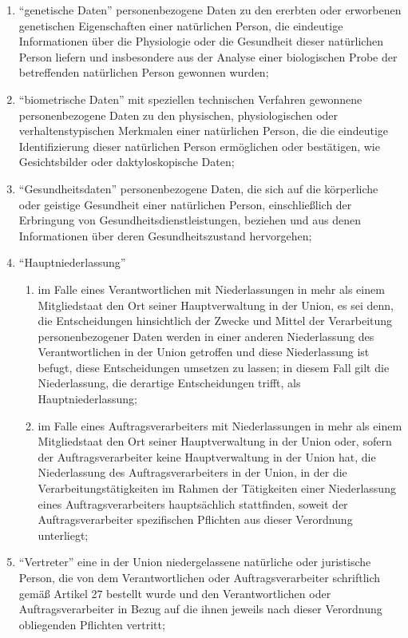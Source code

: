 \begin{enumerate}[label=\arabic*.]
            \item ``genetische Daten'' personenbezogene Daten zu den ererbten oder erworbenen genetischen Eigenschaften einer natürlichen Person, die eindeutige Informationen über die Physiologie oder die Gesundheit dieser natürlichen Person liefern und insbesondere aus der Analyse einer biologischen Probe der betreffenden natürlichen Person gewonnen wurden;
            \item ``biometrische Daten'' mit speziellen technischen Verfahren gewonnene personenbezogene Daten zu den physischen, physiologischen oder verhaltenstypischen Merkmalen einer natürlichen Person, die die eindeutige Identifizierung dieser natürlichen Person ermöglichen oder bestätigen, wie Gesichtsbilder oder daktyloskopische Daten;
            \item ``Gesundheitsdaten'' personenbezogene Daten, die sich auf die körperliche oder geistige Gesundheit einer natürlichen Person, einschließlich der Erbringung von Gesundheitsdienstleistungen, beziehen und aus denen Informationen über deren Gesundheitszustand hervorgehen;
            \item ``Hauptniederlassung''
                \begin{enumerate}[label=\alph*)]
                    \item im Falle eines Verantwortlichen mit Niederlassungen in mehr als einem Mitgliedstaat den Ort seiner Hauptverwaltung in der Union, es sei denn, die Entscheidungen hinsichtlich der Zwecke und Mittel der Verarbeitung personenbezogener Daten werden in einer anderen Niederlassung des Verantwortlichen in der Union getroffen und diese Niederlassung ist befugt, diese Entscheidungen umsetzen zu lassen; in diesem Fall gilt die Niederlassung, die derartige Entscheidungen trifft, als Hauptniederlassung;
                    \item im Falle eines Auftragsverarbeiters mit Niederlassungen in mehr als einem Mitgliedstaat den Ort seiner Hauptverwaltung in der Union oder, sofern der Auftragsverarbeiter keine Hauptverwaltung in der Union hat, die Niederlassung des Auftragsverarbeiters in der Union, in der die Ver\-ar\-bei\-tungs\-tä\-tig\-kei\-ten im Rahmen der Tätigkeiten einer Niederlassung eines Auftragsverarbeiters hauptsächlich stattfinden, soweit der Auftragsverarbeiter spezifischen Pflichten aus dieser Verordnung unterliegt;
                \end{enumerate} 
            \item ``Vertreter'' eine in der Union niedergelassene natürliche oder juristische Person, die von dem Verantwortlichen oder Auftragsverarbeiter schriftlich gemäß Artikel 27 bestellt wurde und den Verantwortlichen oder Auftragsverarbeiter in Bezug auf die ihnen jeweils nach dieser Verordnung obliegenden Pflichten vertritt;

\end{enumerate}

